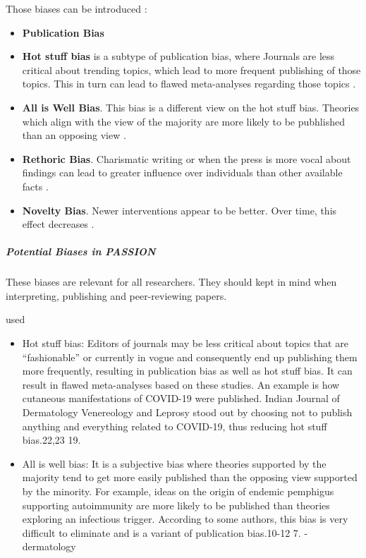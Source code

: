 \begin{refsection}
		Those biases can be introduced :
		\begin{itemize}
			\item \textbf{Publication Bias}
			\item \textbf{Hot stuff bias} is a subtype of publication bias, where Journals are less critical about trending topics, which lead to more frequent publishing of those topics. This in turn can lead to flawed meta-analyses regarding those topics  \autocite{Chakraborty_2024, c22, c23, c19}.
			\item \textbf{All is Well Bias}. This bias is a different view on the hot stuff bias. Theories which align with the view of the majority are more likely to be pubhlished than an opposing view \autocite{Chakraborty_2024, c7,c10-12}.
			\item \textbf{Rethoric Bias}. Charismatic writing or when the press is more vocal about findings can lead to greater influence over individuals than other available facts \autocite{Chakraborty_2024}.
			\item \textbf{Novelty Bias}. Newer interventions appear to be better. Over time, this effect decreases \autocite{Chakraborty_2024}.
		\end{itemize}
		
		\subparagraph{Potential Biases in PASSION}
		These biases are relevant for all researchers. They should kept in mind when interpreting, publishing and peer-reviewing papers.
		
		
		
		\rawcitationstart
		used
		\begin{itemize}		
			\rawcitationusedstart
			\item Hot stuff bias: Editors of journals may be less critical about topics that are “fashionable” or currently in vogue and consequently end up publishing them more frequently, resulting in publication bias as well as hot stuff bias. It can result in flawed meta-analyses based on these studies. An example is how cutaneous manifestations of COVID-19 were published. Indian Journal of Dermatology Venereology and Leprosy stood out by choosing not to publish anything and everything related to COVID-19, thus reducing hot stuff bias.22,23 19. \autocite{Chakraborty_2024}
			\item All is well bias: It is a subjective bias where theories supported by the majority tend to get more easily published than the opposing view supported by the minority. For example, ideas on the origin of endemic pemphigus supporting autoimmunity are more likely to be published than theories exploring an infectious trigger. According to some authors, this bias is very difficult to eliminate and is a variant of publication bias.10-12 7.\autocite{Chakraborty_2024} - dermatology
			

\end{itemize}
\end{refsection}
